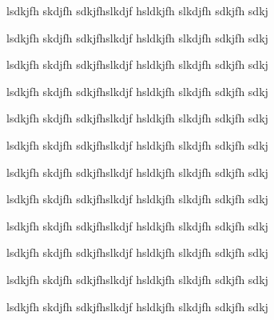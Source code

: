 \documentclass[12pt,twoside,doublepage]{article}
\begin{document}
lsdkjfh skdjfh sdkjfhslkdjf hsldkjfh slkdjfh sdkjfh sdkj

lsdkjfh skdjfh sdkjfhslkdjf hsldkjfh slkdjfh sdkjfh sdkj

lsdkjfh skdjfh sdkjfhslkdjf hsldkjfh slkdjfh sdkjfh sdkj

lsdkjfh skdjfh sdkjfhslkdjf hsldkjfh slkdjfh sdkjfh sdkj

lsdkjfh skdjfh sdkjfhslkdjf hsldkjfh slkdjfh sdkjfh sdkj

lsdkjfh skdjfh sdkjfhslkdjf hsldkjfh slkdjfh sdkjfh sdkj

lsdkjfh skdjfh sdkjfhslkdjf hsldkjfh slkdjfh sdkjfh sdkj

lsdkjfh skdjfh sdkjfhslkdjf hsldkjfh slkdjfh sdkjfh sdkj

lsdkjfh skdjfh sdkjfhslkdjf hsldkjfh slkdjfh sdkjfh sdkj

lsdkjfh skdjfh sdkjfhslkdjf hsldkjfh slkdjfh sdkjfh sdkj

lsdkjfh skdjfh sdkjfhslkdjf hsldkjfh slkdjfh sdkjfh sdkj

lsdkjfh skdjfh sdkjfhslkdjf hsldkjfh slkdjfh sdkjfh sdkj


%
%


\end{document}
